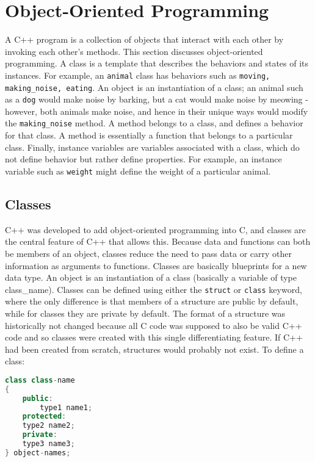 \documentclass[10pt]{article}
\begin{document}
\section{Object-Oriented Programming}

A C++ program is a collection of objects that interact with each other by invoking each other's methods. This section discusses object-oriented programming. A class is a template that describes the behaviors and states of its instances. For example, an \texttt{animal} class has behaviors such as \texttt{moving, making\_noise, eating}. An object is an instantiation of a class; an animal such as a \texttt{dog} would make noise by barking, but a cat would make noise by meowing - however, both animals make noise, and hence in their unique ways would modify the \texttt{making\_noise} method. A method belongs to a class, and defines a behavior for that class. A method is essentially a function that belongs to a particular class. Finally, instance variables are variables associated with a class, which do not define behavior but rather define properties. For example, an instance variable such as \texttt{weight} might define the weight of a particular animal.

\subsection{Classes}

C++ was developed to add object-oriented programming into C, and classes are the central feature of C++ that allows this. Because data and functions can both be members of an object, classes reduce the need to pass data or carry other information as arguments to functions. Classes are basically blueprints for a new data type. An object is an instantiation of a class (basically a variable of type class\_name). Classes can be defined using either the \texttt{struct} or \texttt{class} keyword, where the only difference is that members of a structure are public by default, while for classes they are private by default. The format of a structure was historically not changed because all C code was supposed to also be valid C++ code and so classes were created with this single differentiating feature. If C++ had been created from scratch, structures would probably not exist. To define a class:

\begin{lstlisting}[language=C++]
class class-name
{
    public:
        type1 name1;
    protected:
	type2 name2;
    private:
	type3 name3;
} object-names;
\end{lstlisting}
\end{document}
